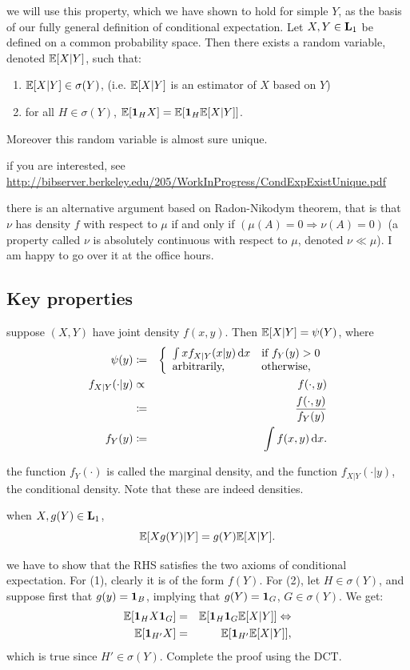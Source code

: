 \documentclass{article}
\begin{document}
 we will use this property, which we have shown to hold for simple $Y$, as the basis of our fully general definition of conditional expectation.  Let $X, Y \in \mathbf L_1$ be defined on a common probability space. Then there exists a random variable, denoted ${\mathbb E}[X|Y]$, such that:
\begin{enumerate}
  \item ${\mathbb E}[X|Y] \in \sigma(Y)$, (i.e. ${\mathbb E}[X|Y]$ is an estimator of $X$ based on $Y$)
  \item for all $H \in \sigma(Y)$, ${\mathbb E}[ {\mathbf 1}_H X ] = {\mathbb E}[ {\mathbf 1}_H {\mathbb E}[X|Y] ]$.
\end{enumerate} 
Moreover this random variable is almost sure unique.

 if you are interested, see \\
{\footnotesize \url{http://bibserver.berkeley.edu/205/WorkInProgress/CondExpExistUnique.pdf}}

 there is an alternative argument based on Radon-Nikodym theorem, that is that $\nu$ has density $f$ with respect to $\mu$ if and only if $(\mu(A) = 0 \Rightarrow \nu(A) = 0)$ (a property called $\nu$ is absolutely continuous with respect to $\mu$, denoted $\nu \ll \mu$). I am happy to go over it at the office hours.


\subsection{Key properties}

 suppose $(X, Y)$ have joint density $f(x,y)$. Then ${\mathbb E}[X|Y] = \psi(Y)$, where 
\begin{eqnarray*} 
\psi(y) &\coloneqq& \left\{ \begin{array}{ll} \int x f_{X|Y}(x|y) \,\mathrm{d} x &\text{if }f_Y(y) > 0 \\ \text{arbitrarily,} &\text{otherwise,} \end{array} \right. \\
 f_{X|Y}(\cdot|y) &\propto& f(\cdot, y) \\
&\coloneqq& \frac{f(\cdot,y)}{f_Y(y)} \\
f_Y(y) &\coloneqq& \int f(x, y) \,\mathrm{d} x.
\end{eqnarray*}

 the function $f_Y(\cdot)$ is called the marginal density, and the function $f_{X|Y}(\cdot|y)$, the conditional density. Note that these are indeed densities. 

 when $X,g(Y) \in \mathbf L_1$, \[ {\mathbb E}[ X g(Y) | Y] = g(Y) {\mathbb E}[X|Y]. \]

 we have to show that the RHS satisfies the two axioms of conditional expectation. For (1), clearly it is of the form $f(Y)$. For (2), let $H \in \sigma(Y)$, and suppose first that $g(y) = {\mathbf 1}_B$, implying that $g(Y) = {\mathbf 1}_G$, $G \in \sigma(Y)$. We get:
\begin{eqnarray*}
{\mathbb E}[ {\mathbf 1}_H X {\mathbf 1}_G ] &=& {\mathbb E}[ {\mathbf 1}_H {\mathbf 1}_G {\mathbb E}[X|Y] ] \Leftrightarrow \\
{\mathbb E}[ {\mathbf 1}_{H'} X ] &=& {\mathbb E}[ {\mathbf 1}_{H'} {\mathbb E}[X|Y] ],
\end{eqnarray*}
which is true since $H' \in \sigma(Y)$. Complete the proof using the DCT.
\end{document}
